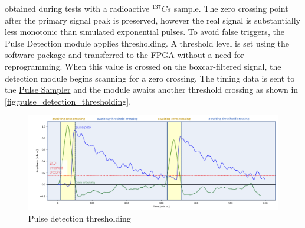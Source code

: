 \documentclass[a4paper,12pt,table]{article}
\begin{document}
		obtained during tests with a radioactive $^{137}Cs$ sample. 
		The zero crossing point after the primary signal peak is preserved, 
		however the real signal is substantially less monotonic than simulated exponential pulses.
		To avoid false triggers, the Pulse Detection module applies thresholding.
		A threshold level is set using the software package 
		and transferred to the FPGA without a need for reprogramming. 
		When this value is crossed on the boxcar-filtered signal, 
		the detection module begins scanning for a zero crossing. 
		The timing data is sent to the \hyperref[ssec:pulse_sampler]{Pulse Sampler}
		and the module awaits another threshold crossing as shown in \autoref{fig:pulse_detection_thresholding}.
		\begin{figure}[!hb]
			\centering
			\includegraphics[width=\textwidth]{img/pulse_detection_internal.png}
			\caption{Pulse detection thresholding}\label{fig:pulse_detection_thresholding}
		\end{figure}
\end{document}
